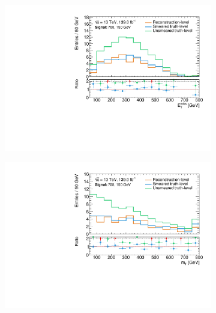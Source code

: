   \begin{figure}
	\centering
	\begin{subfigure}[b]{0.47\linewidth}
		\centering\includegraphics[width=\textwidth]{20210324/700_150/met_C1N2_Wh_hbb_700p0_150p0_smeared.pdf}
	\end{subfigure}\hfill
	\begin{subfigure}[b]{0.47\linewidth}
		\centering\includegraphics[width=\textwidth]{20210324/700_150/mt_C1N2_Wh_hbb_700p0_150p0_smeared.pdf}
	\end{subfigure}\hfill
	\begin{subfigure}[b]{0.47\linewidth}

\end{subfigure}
\end{figure}
